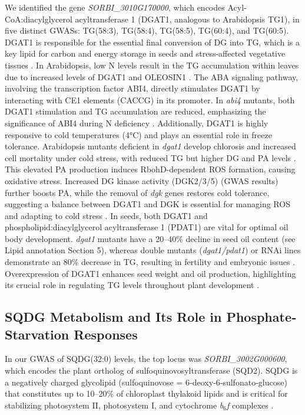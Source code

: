 \documentclass[10pt,letterpaper]{article}
\begin{document}
We identified the gene \textit{SORBI\_3010G170000}, which encodes Acyl‐CoA:diacylglycerol acyltransferase 1 (DGAT1, analogous to Arabidopsis TG1), in five distinct GWASs: TG(58:3), TG(58:4), TG(58:5), TG(60:4), and TG(60:5). DGAT1 is responsible for the essential final conversion of DG into TG, which is a key lipid for carbon and energy storage in seeds and stress-affected vegetative tissues \cite{Zhang2009,Yang2011}. In Arabidopsis, low N levels result in the TG accumulation within leaves due to increased levels of DGAT1 and OLEOSIN1 \cite{Yang2011}. The ABA signaling pathway, involving the transcription factor ABI4, directly stimulates DGAT1 by interacting with CE1 elements (CACCG) in its promoter. In \emph{abi4} mutants, both DGAT1 stimulation and TG accumulation are reduced, emphasizing the significance of ABI4 during N deficiency \cite{Yang2011}. Additionally, DGAT1 is highly responsive to cold temperatures (4°C) and plays an essential role in freeze tolerance. Arabidopsis mutants deficient in \emph{dgat1} develop chlorosis and increased cell mortality under cold stress, with reduced TG but higher DG and PA levels \cite{Tan2018}. This elevated PA production induces RbohD-dependent ROS formation, causing oxidative stress. Increased DG kinase activity (DGK2/3/5) (GWAS results) further boosts PA, while the removal of \emph{dgk} genes restores cold tolerance, suggesting a balance between DGAT1 and DGK is essential for managing ROS and adapting to cold stress \cite{Tan2018}. In seeds, both DGAT1 and phospholipid:diacylglycerol acyltransferase 1 (PDAT1) are vital for optimal oil body development. \emph{dgat1} mutants have a 20–40\% decline in seed oil content (see Lipid annotation Section 5), whereas double mutants (\emph{dgat1/pdat1}) or RNAi lines demonstrate an 80\% decrease in TG, resulting in fertility and embryonic issues \cite{Zhang2009}. Overexpression of DGAT1 enhances seed weight and oil production, highlighting its crucial role in regulating TG levels throughout plant development \cite{Zhang2009,Yang2011}.


\subsection*{SQDG Metabolism and Its Role in Phosphate‐Starvation Responses}

In our GWAS of SQDG(32:0) levels, the top locus was \textit{SORBI\_3002G000600}, which encodes the plant ortholog of sulfoquinovosyltransferase (SQD2). SQDG is a negatively charged glycolipid (sulfoquinovose = 6‑deoxy‑6‑sulfonato‑glucose) that constitutes up to 10–20\% of chloroplast thylakoid lipids and is critical for stabilizing photosystem II, photosystem I, and cytochrome \emph{b}\(_6\)\emph{f} complexes \citep{Yu2002,Qin2015,Umena2011}.
\end{document}
